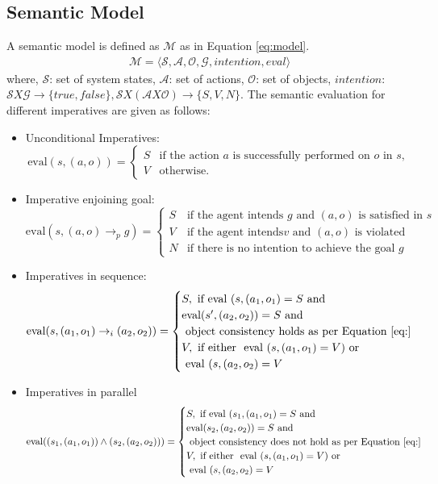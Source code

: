 \documentclass[a4paper,11pt]{lmcs}
\begin{document}
\subsection{Semantic Model}
\label{sec:semantics}
A semantic model is defined as $\mathcal{M}$ as in Equation \ref{eq:model}.
\begin{eqnarray}
 \label{eq:model}
 \mathcal{M} = \langle{\mathcal{S},\mathcal{A},  \mathcal{O}, \mathcal{G}, intention, eval \rangle}
\end{eqnarray}
where,
$\mathcal{S}$: set of system states, $\mathcal{A}$: set of actions, $\mathcal{O}$: set of objects, $intention$: $\mathcal{S} X \mathcal{G} \rightarrow \{true,false\}, \mathcal{S} X (\mathcal{A} X \mathcal{O}) \rightarrow \{S,V,N\} $.
The semantic evaluation for different imperatives are given as follows:
\begin{itemize}
 \item  Unconditional Imperatives: \[
\text{eval}(s, (a, o)) =
\begin{cases}
S & \text{if the action $a$ is successfully performed on $o$ in $s$}, \\
V & \text{otherwise}.
\end{cases}
\]

\item Imperative enjoining goal: \[
\text{eval}(s, (a, o) \rightarrow_p g) =
\begin{cases}
S & \text{if the agent intends } g \text{ and } (a,o) \text{ is satisfied in } s \\
V & \text{if the agent intends} v \text{ and } (a,o) \text{ is violated}  \\
N & \text{if there is no intention to achieve the goal } g
\end{cases}
\]

\item Imperatives in sequence:
\[
\text{eval}(s, (a_1, o_1) \rightarrow_i (a_2,o_2)) =
\begin{cases}
S,  \text{ if} \text{ eval }(s, (a_1,o_1) = S \text{ and}\\  \text{eval} (s', (a_2,o_2)) = S \text{ and} \\  \text{ object consistency holds as per Equation \ref{eq:}} \\ V, \text{ if either }  \text{ eval }(s, (a_1,o_1) = V) \text{ or }  \\ \text{ eval }(s, (a_2,o_2) = V
\end{cases}
\]

\item Imperatives in parallel
\[
\text{eval}((s_1, (a_1, o_1)) \wedge (s_2,(a_2,o_2))) =
\begin{cases}
S,  \text{ if} \text{ eval }(s_1, (a_1,o_1) = S \text{ and}\\  \text{eval} (s_2, (a_2,o_2)) = S \text{ and} \\  \text{ object consistency does not hold as per Equation \ref{eq:}} \\ V, \text{ if either }  \text{ eval }(s, (a_1,o_1) = V) \text{ or }  \\ \text{ eval }(s, (a_2,o_2) = V
\end{cases}
\]


\end{itemize}
\end{document}
